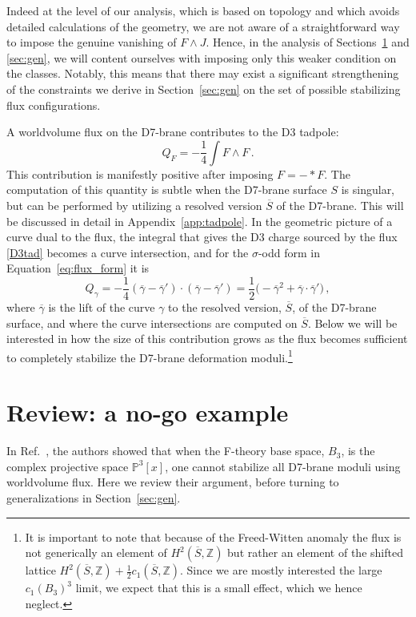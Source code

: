 \documentclass[a4paper,12pt]{article}
\numberwithin{equation}{section}
\newcommand{\w}{\ensuremath{\wedge}}
\newcommand{\mbb}{\mathbb}
\newcommand{\be}{\begin{equation}}
\newcommand{\ee}{\end{equation}}
\newcommand{\fthb}{B_3}				%
\newcommand{\ori}{\sigma}				%
\newcommand{\db}{S}					%
\newcommand{\dbl}{\overline{S}}		%
\newcommand{\crv}{\gamma}			%
\newcommand{\crvl}{\overline{\gamma}}	%
\newcommand{\flxcont}[1]{Q_{#1}}		%
\begin{document}
Indeed at the level of our analysis, which is based on topology and which avoids detailed calculations of the geometry, we are not aware of a straightforward way to impose the genuine vanishing of $F \wedge J$. Hence, in the analysis of Sections~\ref{sec:nogo_review} and \ref{sec:gen}, we will content ourselves with imposing only this weaker condition on the classes. Notably, this means that there may exist a significant strengthening of the constraints we derive in Section~\ref{sec:gen} on the set of possible stabilizing flux configurations.

\bigskip

A worldvolume flux on the D7-brane contributes to the D3 tadpole:
\be
Q_F = - \frac{1}{4}\int F \w F \,. \label{D3tad}
\ee
This contribution is manifestly positive after imposing $F = -* F$. The computation of this quantity is subtle when the D7-brane surface $\db$ is singular, but can be performed by utilizing a resolved version $\dbl$ of the D7-brane. This will be discussed in detail in Appendix~\ref{app:tadpole}. In the geometric picture of a curve dual to the flux, the integral that gives the D3 charge sourced by the flux \eqref{D3tad} becomes a curve intersection, and for the $\ori$-odd form in Equation~\eqref{eq:flux_form} it is
\be
\flxcont{\crv} = - \frac{1}{4}(\crvl - \crvl') \cdot (\crvl - \crvl') = \frac{1}{2}\big(-\crvl^2 + \crvl \cdot \crvl'\big) \,,
\label{eq:tadp_cont_gen}
\ee
where $\crvl$ is the lift of the curve $\crv$ to the resolved version, $\dbl$, of the D7-brane surface, and where the curve intersections are computed on $\dbl$. Below we will be interested in how the size of this contribution grows as the flux becomes sufficient to completely stabilize the D7-brane deformation moduli.\footnote{It is important to note that because of the Freed-Witten anomaly the flux is not generically an element of $H^2(\dbl,\mbb{Z})$ but rather an element of the shifted lattice $H^2(\dbl,\mbb{Z}) + \frac{1}{2}c_1(\dbl,\mbb{Z})$. Since we are mostly interested the large  $c_1(\fthb)^3$ limit, we expect that this is a small effect, which we hence neglect.}

\section{Review: a no-go example}
\label{sec:nogo_review}

In Ref.~\cite{Collinucci:2008pf}, the authors showed that when the F-theory base space, $\fthb$, is the complex projective space $\mbb{P}^3[x]$, one cannot stabilize all D7-brane moduli using worldvolume flux. Here we review their argument, before turning to generalizations in Section~\ref{sec:gen}.
\end{document}
